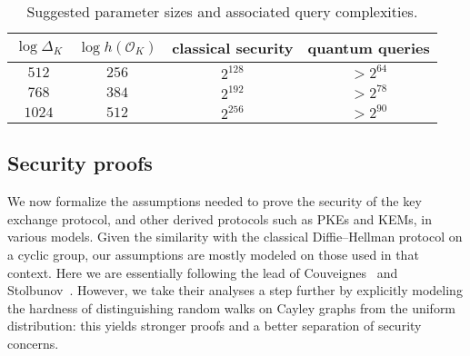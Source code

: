 \documentclass{llncs}
\renewcommand{\O}{\mathcal{O}}
\begin{document}

\begin{table}
    \renewcommand{\arraystretch}{1.4}
    \centering
    \begin{tabular}{c@{\;}|@{\;}c@{\;}|@{\;}c@{\;}|@{\;}c}
        $\log Δ_K$ & $\log h(\O_K)$
        & \parbox{10ex}{\centering classical security}
        & \parbox{10ex}{\centering quantum queries} \\
        \hline
        $512$  & $256$ & $2^{128}$ & $> 2^{64}$ \\
        $768$  & $384$ & $2^{192}$ & $> 2^{78}$ \\
        $1024$ & $512$ & $2^{256}$ & $> 2^{90}$
        \\
        \hline
    \end{tabular}
    \smallskip
    \caption{Suggested parameter sizes and associated query complexities.}
    \label{tab:sizes}
\end{table}

\subsection{Security proofs}
\label{sec:proofs}

We now formalize the assumptions needed to prove the security of the
key exchange protocol, and other derived protocols such as PKEs and
KEMs, in various models. Given the similarity with the classical
Diffie--Hellman protocol on a cyclic group, our assumptions are
mostly modeled on those used in that context. Here we are
essentially following the lead of
Couveignes~\cite{cryptoeprint:2006:291} and
Stolbunov~\cite{Stol,Stolbunov2012}.
However, we take their analyses a
step further by explicitly modeling the hardness of distinguishing
random walks on Cayley graphs from the uniform distribution: this
yields stronger proofs and a better separation of security concerns.
\end{document}
